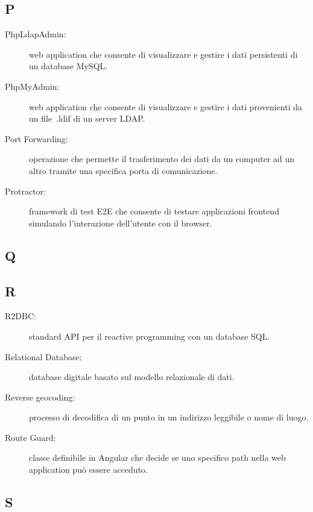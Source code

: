 \documentclass[../manuale-manutentore.tex]{subfiles}
\begin{document}
\subsection{P}

\begin{description}
    \item[PhpLdapAdmin:] web application che consente di visualizzare e gestire i dati persistenti di un database MySQL\@.
    \item[PhpMyAdmin:] web application che consente di visualizzare e gestire i dati provenienti da un file~.ldif di un server LDAP\@.
    \item[Port Forwarding:] operazione che permette il trasferimento dei dati da un computer ad un altro tramite una specifica porta di comunicazione.
    \item[Protractor:] framework di test E2E che consente di testare applicazioni frontend simulando l'interazione dell'utente con il browser.
\end{description}

\subsection{Q}

\subsection{R}

\begin{description}
    \item[R2DBC:] standard API per il reactive programming con un database SQL\@.
    \item[Relational Database:] database digitale basato sul modello relazionale di dati.
    \item[Reverse geocoding:] processo di decodifica di un punto in un indirizzo leggibile o nome di luogo.
    \item[Route Guard:] classe definibile in Angular che decide se uno specifico path nella web application può essere acceduto.
\end{description}

\subsection{S}
\end{document}
